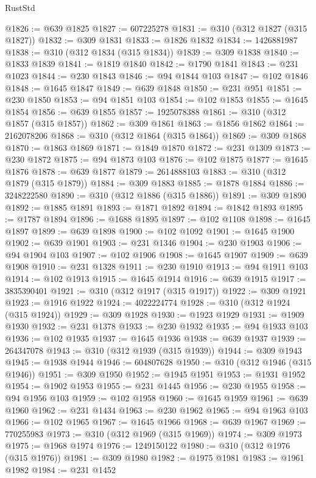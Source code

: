 \begin{lexlean}{RustStd}
\begin{coremodule}
@1826 := @639 @1825
@1827 := 607225278
@1831 := @310 (@312 @1827 (@315 @1827))
@1832 := @309 @1831
@1833 := @1826 @1832
@1834 := 1426881987
@1838 := @310 (@312 @1834 (@315 @1834))
@1839 := @309 @1838
@1840 := @1833 @1839
@1841 := @1819 @1840
@1842 := @1790 @1841
@1843 := @231 @1023
@1844 := @230 @1843
@1846 := @94 @1844 @103
@1847 := @102 @1846
@1848 := @1645 @1847
@1849 := @639 @1848
@1850 := @231 @951
@1851 := @230 @1850
@1853 := @94 @1851 @103
@1854 := @102 @1853
@1855 := @1645 @1854
@1856 := @639 @1855
@1857 := 1925078388
@1861 := @310 (@312 @1857 (@315 @1857))
@1862 := @309 @1861
@1863 := @1856 @1862
@1864 := 2162078206
@1868 := @310 (@312 @1864 (@315 @1864))
@1869 := @309 @1868
@1870 := @1863 @1869
@1871 := @1849 @1870
@1872 := @231 @1309
@1873 := @230 @1872
@1875 := @94 @1873 @103
@1876 := @102 @1875
@1877 := @1645 @1876
@1878 := @639 @1877
@1879 := 2614888103
@1883 := @310 (@312 @1879 (@315 @1879))
@1884 := @309 @1883
@1885 := @1878 @1884
@1886 := 3248222580
@1890 := @310 (@312 @1886 (@315 @1886))
@1891 := @309 @1890
@1892 := @1885 @1891
@1893 := @1871 @1892
@1894 := @1842 @1893
@1895 := @1787 @1894
@1896 := @1688 @1895
@1897 := @102 @1108
@1898 := @1645 @1897
@1899 := @639 @1898
@1900 := @102 @1092
@1901 := @1645 @1900
@1902 := @639 @1901
@1903 := @231 @1346
@1904 := @230 @1903
@1906 := @94 @1904 @103
@1907 := @102 @1906
@1908 := @1645 @1907
@1909 := @639 @1908
@1910 := @231 @1328
@1911 := @230 @1910
@1913 := @94 @1911 @103
@1914 := @102 @1913
@1915 := @1645 @1914
@1916 := @639 @1915
@1917 := 3835390401
@1921 := @310 (@312 @1917 (@315 @1917))
@1922 := @309 @1921
@1923 := @1916 @1922
@1924 := 4022224774
@1928 := @310 (@312 @1924 (@315 @1924))
@1929 := @309 @1928
@1930 := @1923 @1929
@1931 := @1909 @1930
@1932 := @231 @1378
@1933 := @230 @1932
@1935 := @94 @1933 @103
@1936 := @102 @1935
@1937 := @1645 @1936
@1938 := @639 @1937
@1939 := 264347078
@1943 := @310 (@312 @1939 (@315 @1939))
@1944 := @309 @1943
@1945 := @1938 @1944
@1946 := 604807628
@1950 := @310 (@312 @1946 (@315 @1946))
@1951 := @309 @1950
@1952 := @1945 @1951
@1953 := @1931 @1952
@1954 := @1902 @1953
@1955 := @231 @1445
@1956 := @230 @1955
@1958 := @94 @1956 @103
@1959 := @102 @1958
@1960 := @1645 @1959
@1961 := @639 @1960
@1962 := @231 @1434
@1963 := @230 @1962
@1965 := @94 @1963 @103
@1966 := @102 @1965
@1967 := @1645 @1966
@1968 := @639 @1967
@1969 := 770255983
@1973 := @310 (@312 @1969 (@315 @1969))
@1974 := @309 @1973
@1975 := @1968 @1974
@1976 := 1249150122
@1980 := @310 (@312 @1976 (@315 @1976))
@1981 := @309 @1980
@1982 := @1975 @1981
@1983 := @1961 @1982
@1984 := @231 @1452

\end{coremodule}
\end{lexlean}

